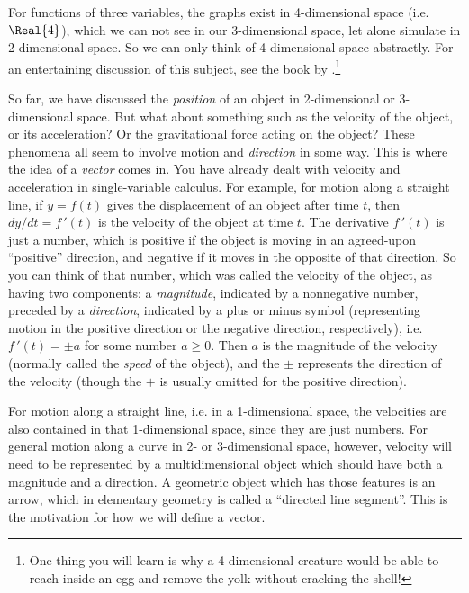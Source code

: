 For functions of three variables, the graphs exist in 4-dimensional space (i.e. $\Real{4}$),
which we can not see in our 3-dimensional space, let alone simulate in 2-dimensional space.  So we
can only think of 4-dimensional space abstractly.  For an entertaining discussion of this subject, see the book by
\cite{abb}.\footnote{One thing you will learn is why a 4-dimensional creature would be able to reach inside an egg and
remove the yolk without cracking the shell!}

So far, we have discussed the \emph{position} of an object in 2-dimensional or 3-dimensional space.
But what about something such as the velocity of the object, or its acceleration?
Or the gravitational force acting on the object? These phenomena all seem to involve motion and \emph{direction} in some
way.  This is where the idea of a \emph{vector} comes in.
\newpage
You have already dealt with velocity and acceleration in single-variable calculus.  For example, for motion along a
straight line, if $y = f(t)$ gives the displacement of an object after time $t$, then $dy/dt = f\,'(t)$ is the velocity
of the object at time $t$.  The derivative
$f\,'(t)$ is just a number, which is positive if the object is moving in an
agreed-upon ``positive'' direction, and negative if it moves in the opposite of that direction. So you can think of
that number, which was called the velocity of the object, as having two components: a \emph{magnitude}, indicated by
a nonnegative number, preceded by a \emph{direction}, indicated by a plus or minus symbol (representing motion in the
positive direction or the negative direction, respectively), i.e. $f\,'(t) = \pm a$ for some number $a \ge 0$.  Then
$a$ is the magnitude of the velocity (normally called the \emph{speed} of the object), and the $\pm$ represents the
direction of the velocity (though the $+$ is usually omitted for the positive direction).

For motion along a straight line, i.e. in a 1-dimensional space, the velocities are also contained in that
1-dimensional space, since they are just numbers.  For general motion along a curve in 2- or 3-dimensional space,
however, velocity will need to be represented by a multidimensional object which should have both a magnitude and a
direction.  A geometric object which has those features is an arrow, which in elementary geometry is called a
``directed line segment''.  This is the motivation for how we will define a vector.



